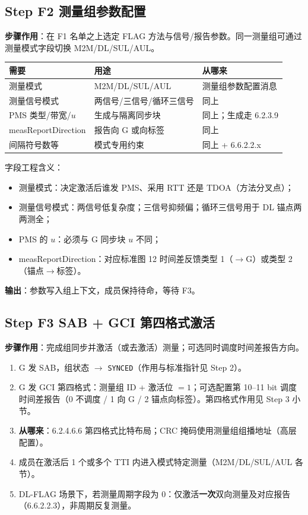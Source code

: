 \documentclass[11pt,a4paper]{ctexart}
\begin{document}
\subsection{Step F2 测量组参数配置}

\textbf{步骤作用}：在 F1 名单之上选定 FLAG 方法与信号/报告参数。同一测量组可通过测量模式字段切换 M2M/DL/SUL/AUL。

\begin{table}[h]
\centering
\small
\begin{tabular}{L{3.2cm}L{5.2cm}L{4.5cm}}
\toprule
\textbf{需要} & \textbf{用途} & \textbf{从哪来} \\
\midrule
测量模式 & M2M/DL/SUL/AUL & 测量组参数配置消息 \\
测量信号模式 & 两信号/三信号/循环三信号 & 同上 \\
PMS 类型/带宽/$u$ & 生成与隔离同步块 & 同上；生成走 6.2.3.9 \\
measReportDirection & 报告向 G 或向标签 & 同上 \\
间隔符号数等 & 模式专用约束 & 同上 + 6.6.2.2.x \\
\bottomrule
\end{tabular}
\end{table}

字段工程含义：
\begin{itemize}[nosep]
  \item 测量模式：决定激活后谁发 PMS、采用 RTT 还是 TDOA（方法分叉点）；
  \item 测量信号模式：两信号低复杂度；三信号抑频偏；循环三信号用于 DL 锚点两两测全；
  \item PMS 的 $u$：必须与 G 同步块 $u$ 不同；
  \item measReportDirection：对应标准图 12 时间差反馈类型 1（$\to$G）或类型 2（锚点$\to$标签）。
\end{itemize}

\textbf{输出}：参数写入组上下文，成员保持待命，等待 F3。

\subsection{Step F3 SAB + GCI 第四格式激活}

\textbf{步骤作用}：完成组同步并激活（或去激活）测量；可选同时调度时间差报告方向。

\begin{enumerate}
  \item G 发 SAB，组状态 $\rightarrow$ \texttt{SYNCED}（作用与标准指针见 Step 2）。
  \item G 发 GCI 第四格式：测量组 ID + 激活位 $=1$；可选配置第 10--11 bit 调度时间差报告（0 不调度 / 1 向 G / 2 锚点向标签）。第四格式作用见 Step 3 小节。
  \item \textbf{从哪来}：6.2.4.6.6 第四格式比特布局；CRC 掩码使用测量组组播地址（高层配置）。
  \item 成员在激活后 1 个或多个 TTI 内进入模式特定测量（M2M/DL/SUL/AUL 各节）。
  \item DL-FLAG 场景下，若测量周期字段为 0：仅激活\textbf{一次}双向测量及对应报告（6.6.2.2.3），非周期反复测量。
\end{enumerate}
\end{document}
